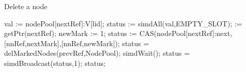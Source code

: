 \documentclass[11pt,onecolumn]{IEEEtran}
\begin{document}
\begin{algorithm}
  \caption{Delete a node}
  \label{alg:delnode}
  \begin{algorithmic}[5]  
         \State val := nodePool[nextRef]:V[lid];
         \State status := simdAll(val,EMPTY\_SLOT);
            := getPtr(nextRef);
           \State newMark := 1;
              \State status := CAS(nodePool[nextRef]:next,[nnRef,nextMark],[nnRef,newMark]);
                \State status = delMarkedNodes(prevRef,NodePool); 
              \EndIf
           \EndIf
           \State simdWait();
           \State status = simdBroadcast(status,1);
           \State
           \Return status;
         \EndIf
    \EndFunction
  \end{algorithmic}
\end{algorithm}

%


\end{document}
